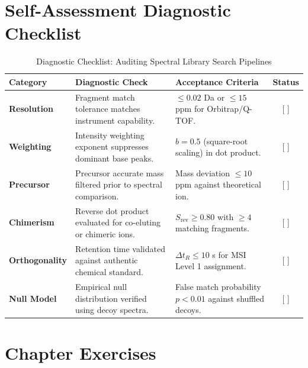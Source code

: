 \documentclass[11pt,twoside,openright]{book}
\begin{document}
\section{Self-Assessment Diagnostic Checklist}

\begin{table}[ht]
\centering
\caption{Diagnostic Checklist: Auditing Spectral Library Search Pipelines}
\label{tab:library_checklist}
\small
\begin{tabularx}{\textwidth}{l p{5.5cm} X c}
\toprule
\textbf{Category} & \textbf{Diagnostic Check} & \textbf{Acceptance Criteria} & \textbf{Status} \\
\midrule
\textbf{Resolution} & Fragment match tolerance matches instrument capability. & $\le 0.02$ Da or $\le 15$ ppm for Orbitrap/Q-TOF. & [ ] \\
\addlinespace
\textbf{Weighting} & Intensity weighting exponent suppresses dominant base peaks. & $b = 0.5$ (square-root scaling) in dot product. & [ ] \\
\addlinespace
\textbf{Precursor} & Precursor accurate mass filtered prior to spectral comparison. & Mass deviation $\le 10$ ppm against theoretical ion. & [ ] \\
\addlinespace
\textbf{Chimerism} & Reverse dot product evaluated for co-eluting or chimeric ions. & $S_{\text{rev}} \ge 0.80$ with $\ge 4$ matching fragments. & [ ] \\
\addlinespace
\textbf{Orthogonality} & Retention time validated against authentic chemical standard. & $\Delta t_R \le 10$ s for MSI Level 1 assignment. & [ ] \\
\addlinespace
\textbf{Null Model} & Empirical null distribution verified using decoy spectra. & False match probability $p < 0.01$ against shuffled decoys. & [ ] \\
\bottomrule
\end{tabularx}
\end{table}

\FloatBarrier

\section{Chapter Exercises}
\end{document}

